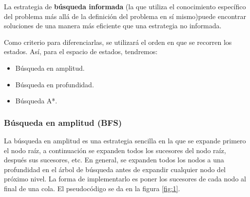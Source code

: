 \documentclass[twoside,twocolumn]{article}
\begin{document}
La estrategia de \textbf{búsqueda informada} (la que utiliza el
conocimiento específico del problema más allá de la definición del problema en sí mismo)puede encontrar soluciones de una manera más eficiente que una estrategia no informada.

\noindent
Como criterio para diferenciarlas, se utilizará el orden en que se recorren los estados. Así, para el espacio de estados, tendremos:

\begin{itemize}
    \item Búsqueda en amplitud.
    \item Búsqueda en profundidad.
    \item Búsqueda A*.
\end{itemize}


\subsubsection{Búsqueda en amplitud (BFS)}

La búsqueda en amplitud es una estrategia sencilla en la que se expande primero el nodo raíz, a continuación se expanden todos los sucesores del nodo raíz, después sus sucesores, etc. En general, se expanden todos los nodos a una profundidad en el árbol de búsqueda antes de expandir cualquier nodo del próximo nivel. La forma de implementarlo es poner los sucesores de cada nodo al final de una cola. El pseudocódigo se da en la figura \ref{fig:1}.






\end{document}
